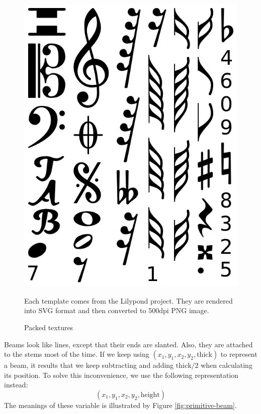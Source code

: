 \begin{figure}[h]
    \centering
    \includegraphics[scale=0.2]{Figures/primitive-texture.png}
    \caption{Packed textures}
    \label{fig:primitive-texture}
    \startdescription
    Each template comes from the Lilypond project. They are rendered into SVG format and then converted to 500dpi PNG image.
\end{figure}

Beams look like lines, except that their ends are slanted. Also, they are attached to the stems most of the time. If we keep using $(x_1, y_1, x_2, y_2, \mathrm{thick})$ to represent a beam, it results that we keep subtracting and adding $\mathrm{thick} / 2$ when calculating
its position. To solve this inconvenience, we use the following representation instead:
\[
    (x_1, y_1, x_2, y_2, \mathrm{height})
\]
The meanings of these variable is illustrated by Figure \ref{fig:primitive-beam}.

